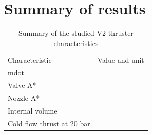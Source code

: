 
        \section{Summary of results}

            \begin{table}[]
                \caption{Summary of the studied V2 thruster characteristics}
                \label{tab:characteristics}
                \begin{tabular}{ll}
                Characteristic             & Value and unit \\
                mdot                       &                \\
                Valve A*                   &                \\
                Nozzle A*                  &                \\
                Internal volume            &                \\
                Cold flow thrust at 20 bar &               
                \end{tabular}
            \end{table}
 

            

        



